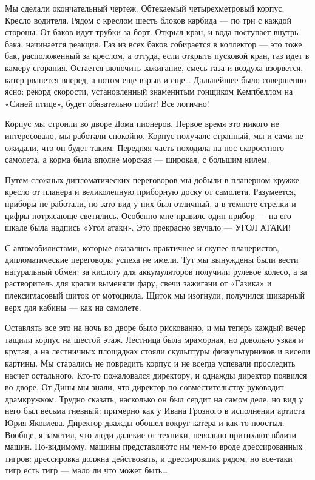 Мы сделали окончательный чертеж. Обтекаемый четырехметровый корпус. Кресло
водителя. Рядом с креслом шесть блоков карбида — по три с каждой  стороны.
От баков идут трубки за борт.  Открыл кран, и вода поступает внутрь  бака,
начинается реакция. Газ из  всех баков собирается в  коллектор — это  тоже
бак, расположенный за креслом, а  оттуда, если открыть пусковой кран,  газ
идет в камеру сгорания. Остается включить зажигание, смесь газа и  воздуха
взорвется, катер рванется вперед, а потом еще взрыв и еще… Дальнейшее было
совершенно  ясно:  рекорд  скорости,  установленный  знаменитым   гонщиком
Кемпбеллом на «Синей птице», будет обязательно побит! Все логично!

Корпус мы  строили во  дворе Дома  пионеров. Первое  время это  никого  не
интересовало, мы работали спокойно. Корпус получалс странный, мы и сами не
ожидали, что он будет  таким. Передняя часть  походила на нос  скоростного
самолета, а корма была вполне морская — широкая, с большим килем.

Путем сложных  дипломатических переговоров  мы добыли  в планерном  кружке
кресло от планера и великолепную приборную доску от самолета.  Разумеется,
приборы не работали, но зато вид у них был отличный, а в темноте стрелки и
цифры потрясающе  светились. Особенно  мне нравилс  один прибор  — на  его
шкале была надпись «Угол атаки». Это прекрасно звучало — УГОЛ АТАКИ!

С автомобилистами,  которые  оказались практичнее  и  скупее  планеристов,
дипломатические переговоры успеха  не имели. Тут  мы вынуждены были  вести
натуральный обмен: за кислоту для аккумуляторов получили рулевое колесо, а
за растворитель для  краски выменяли  фару, свечи зажигани  от «Газика»  и
плексигласовый щиток от мотоцикла.  Щиток мы изогнули, получился  шикарный
верх для кабины — как на самолете.

Оставлять все это  на ночь во  дворе было рискованно,  и мы теперь  каждый
вечер тащили корпус на шестой  этаж. Лестница была мраморная, но  довольно
узкая  и   крутая,   а   на   лестничных   площадках   стояли   скульптуры
физкультурников и висели картины.  Мы старались не  повредить корпус и  не
всегда  успевали   проследить   насчет  остального.   Кто-то   пожаловался
директору, и однажды  директор появился во  дворе. От Дины  мы знали,  что
директор  по  совместительству  руководит  драмкружком.  Трудно   сказать,
насколько он был сердит на самом деле,  но вид у него был весьма  гневный:
примерно как у Ивана Грозного в исполнении артиста Юрия Яковлева. Директор
дважды обошел вокруг катера и как-то поостыл. Вообще, я заметил, что  люди
далекие от техники, невольно  притихают вблизи машин. По-видимому,  машины
представляютс им чем-то  вроде дрессированных  тигров: дрессировка  должна
действовать, и дрессировщик рядом,  но все-таки тигр есть  тигр — мало  ли
что может быть…

